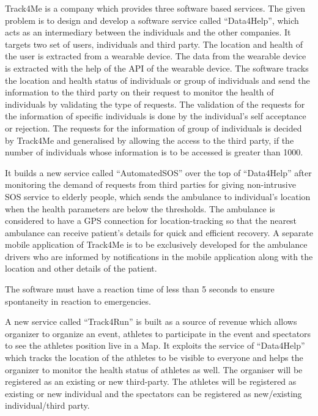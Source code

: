 Track4Me is a company which provides three software based services. The given problem is to design and develop a software service called  “Data4Help”,  which acts as an intermediary between the individuals and the other companies. It targets two set of users, individuals and third party. The location and health of the user is extracted from a wearable device. The data from the wearable device is extracted with the help of the API of the wearable device. The software tracks the location and health status of individuals or group of individuals and send the information to the third party on their request to monitor the health of individuals by validating the type of requests. The validation of the requests for the information of specific individuals is done by the individual’s self acceptance or rejection. The requests for the information of group of individuals is decided by Track4Me and generalised by allowing the access to the third party, if the number of individuals whose information is to be accessed is greater than 1000.

It builds a new service called “AutomatedSOS” over the top of “Data4Help” after monitoring the demand of requests from third parties for giving non-intrusive SOS service to elderly people, which sends the ambulance to individual’s location when the health parameters are below the thresholds.
 The ambulance is considered to have a GPS connection for location-tracking so that the nearest ambulance can receive patient’s details for quick and efficient recovery. A separate mobile application of Track4Me is to be exclusively developed for the ambulance drivers who are informed by notifications in the mobile application along with the location and other details of the patient. 

The software must have a reaction time of less than 5 seconds to ensure spontaneity in reaction to emergencies.

A new service called “Track4Run” is built as a source of revenue which allows organizer to organize an event, athletes to participate in the event and spectators to see the athletes position live in a Map. It exploits the service of “Data4Help” which tracks the location of the athletes to be visible to everyone and helps the organizer to monitor the health status of athletes as well. The organiser will be registered as an existing or new third-party. The athletes will be registered as existing or new individual and the spectators can be registered as new/existing individual/third party.

